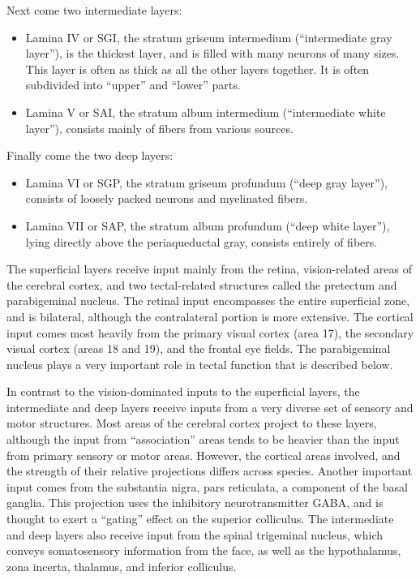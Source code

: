 \documentclass[]{book}
\providecommand{\tightlist}{%
  \setlength{\itemsep}{0pt}\setlength{\parskip}{0pt}}
\begin{document}
Next come two intermediate layers:

\begin{itemize}
\tightlist
\item
  Lamina IV or SGI, the stratum griseum intermedium (``intermediate gray layer''), is the thickest layer, and is filled with many neurons of many sizes. This layer is often as thick as all the other layers together. It is often subdivided into ``upper'' and ``lower'' parts.
\item
  Lamina V or SAI, the stratum album intermedium (``intermediate white layer''), consists mainly of fibers from various sources.
\end{itemize}

Finally come the two deep layers:

\begin{itemize}
\tightlist
\item
  Lamina VI or SGP, the stratum griseum profundum (``deep gray layer''), consists of loosely packed neurons and myelinated fibers.
\item
  Lamina VII or SAP, the stratum album profundum (``deep white layer''), lying directly above the periaqueductal gray, consists entirely of fibers.
\end{itemize}

The superficial layers receive input mainly from the retina, vision-related areas of the cerebral cortex, and two tectal-related structures called the pretectum and parabigeminal nucleus. The retinal input encompasses the entire superficial zone, and is bilateral, although the contralateral portion is more extensive. The cortical input comes most heavily from the primary visual cortex (area 17), the secondary visual cortex (areas 18 and 19), and the frontal eye fields. The parabigeminal nucleus plays a very important role in tectal function that is described below.

In contrast to the vision-dominated inputs to the superficial layers, the intermediate and deep layers receive inputs from a very diverse set of sensory and motor structures. Most areas of the cerebral cortex project to these layers, although the input from ``association'' areas tends to be heavier than the input from primary sensory or motor areas. However, the cortical areas involved, and the strength of their relative projections differs across species. Another important input comes from the substantia nigra, pars reticulata, a component of the basal ganglia. This projection uses the inhibitory neurotransmitter GABA, and is thought to exert a ``gating'' effect on the superior colliculus. The intermediate and deep layers also receive input from the spinal trigeminal nucleus, which conveys somatosensory information from the face, as well as the hypothalamus, zona incerta, thalamus, and inferior colliculus.
\end{document}
